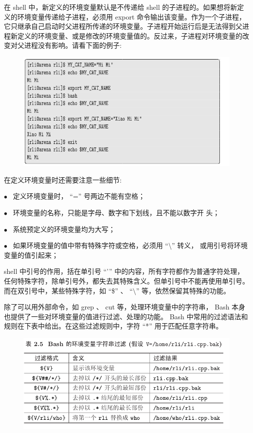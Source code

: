 \documentclass[12pt，a4paper]{article}
\numberwithin{equation}{section}
\begin{document}
在 shell 中，新定义的环境变量默认是不传递给 shell 的子进程的。如果想将新定义的环境变量传递给子进程，必须用 export 命令输出该变量。作为一个子进程，它只继承自己启动时父进程所传递的环境变量。子进程开始运行后是无法得到父进程新定义的环境变量、或是修改的环境变量值的。反过来，子进程对环境变量的改变对父进程没有影响。请看下面的例子:
\begin{figure}[H]
\centering
\includegraphics[scale=0.6]{./figures/241.png}
\end{figure}
在定义环境变量时还需要注意一些细节:

$\bullet$~ 定义环境变量时， “=” 号两边不能有空格；

$\bullet$~ 环境变量的名称，只能是字母、数字和下划线，且不能以数字开
头；

$\bullet$~ 系统预定义的环境变量均为大写；

$\bullet$~ 如果环境变量的值中带有特殊字符或空格，必须用 “$\setminus$” 转义，
或用引号将环境变量的值引起来；

shell 中引号的作用，括在单引号 “'” 中的内容，所有字符都作为普通字符处理，任何特殊字符，除单引号外，都失去其特殊含义。但单引号中不能再使用单引号。而在双引号中，某些特殊字符，如 “\$” 、 “$\setminus$” 等，依然保留其特殊的功能。

除了可以用外部命令，如 grep 、 cut 等，处理环境变量中的字符串， Bash 本身也提供了一些对环境变量的值进行过滤、处理的功能。 Bash 中常用的过滤语法和规则在下表中给出。在这些过滤规则中，字符 “*” 用于匹配任意字符串。
\begin{figure}[H]
\centering
\includegraphics[scale=0.6]{./figures/242.png}
\end{figure}
\end{document}
